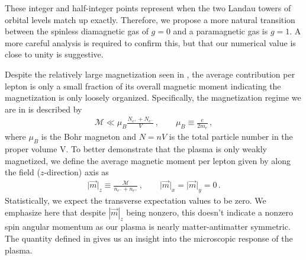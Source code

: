 These integer and half-integer points represent when the two Landau towers of orbital levels match up exactly. Therefore, we propose a more natural transition between the spinless diamagnetic gas of $g=0$ and a paramagnetic gas is $g=1$. A more careful analysis is required to confirm this, but that our numerical value is close to unity is suggestive.

Despite the relatively large magnetization seen in , the average contribution per lepton is only a small fraction of its overall magnetic moment indicating the magnetization is only loosely organized. Specifically, the magnetization regime we are in is described by
\begin{align}
 \label{fractionalmagnetization}
 \mathcal{M}\ll\mu_{B}\frac{N_{e^{+}}+N_{e^{-}}}{V}\,,\qquad\mu_{B}\equiv\frac{e}{2m_{e}}\,,
\end{align}
where $\mu_{B}$ is the Bohr magneton and $N=nV$ is the total particle number in the proper volume V. To better demonstrate that the plasma is only weakly magnetized, we define the average magnetic moment per lepton given by along the field ($z$-direction) axis as
\begin{align}
 \label{momentperlepton}
 \vert\vec{m}\vert_{z}\equiv\frac{\mathcal{M}}{n_{e^{-}}+n_{e^{+}}}\,,\qquad\vert\vec{m}\vert_{x}=\vert\vec{m}\vert_{y}=0\,.
\end{align}
Statistically, we expect the transverse expectation values to be zero. We emphasize here that despite $|\vec{m}|_{z}$ being nonzero, this doesn't indicate a nonzero spin angular momentum as our plasma is nearly matter-antimatter symmetric. The quantity defined in  gives us an insight into the microscopic response of the plasma.

